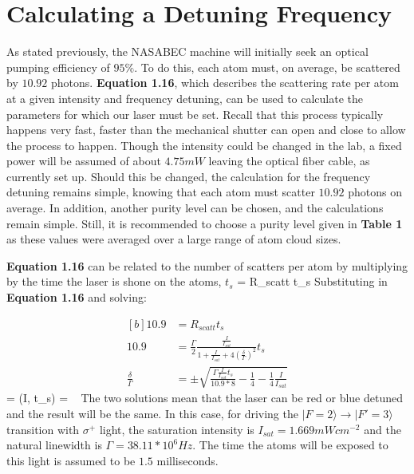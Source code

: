 \section{Calculating a Detuning Frequency}
As stated previously, the NASABEC machine will initially seek an optical pumping efficiency of $95\%$. To do this, each atom must, on average, be scattered by $10.92$ photons. \textbf{Equation 1.16}, which describes the scattering rate per atom at a given intensity and frequency detuning, can be used to calculate the parameters for which our laser must be set. Recall that this process typically happens very fast, faster than the mechanical shutter can open and close to allow the process to happen. Though the intensity could be changed in the lab, a fixed power will be assumed of about $4.75 mW$ leaving the optical fiber cable, as currently set up. Should this be changed, the calculation for the frequency detuning remains simple, knowing that each atom must scatter $10.92$ photons on average. In addition, another purity level can be chosen, and the calculations remain simple. Still, it is recommended to choose a purity level given in \textbf{Table 1} as these values were averaged over a large range of atom cloud sizes. 

\textbf{Equation 1.16} can be related to the number of scatters per atom by multiplying by the time the laser is shone on the atoms, $t_s$
 = R_{scatt} t_s
\eeq
Substituting in \textbf{Equation 1.16} and solving:

\begin{equation}
        \begin{aligned}[b]
            10.9 &= R_{scatt} t_s\\
            10.9 &=  \frac{\Gamma}{2} \frac{\frac{I}{I_{sat}}}{1 + \frac{I}{I_{sat}} + 4 \left( \frac{\delta}{\Gamma}\right)^2 }t_s\\
            \frac{\delta}{\Gamma} &= \pm \sqrt{\frac{\Gamma\frac{I}{I_{sat}}t_s}{10.9*8} - \frac{1}{4} - \frac{1}{4}\frac{I}{I_{sat}}}
        \end{aligned}
\label{eqn2.qo}
\end{equation}
\beq
\delta = \delta(I, t_s) = \pm {}\ \Gamma
\eeq
The two solutions mean that the laser can be red or blue detuned and the result will be the same. In this case, for driving the $|F=2\rangle \rightarrow |F'=3\rangle$ transition with $\sigma^+$ light, the saturation intensity is $I_{sat} = 1.669 mWcm^{-2}$ and the natural linewidth is $\Gamma = 38.11 * 10^6Hz$. The time the atoms will be exposed to this light is assumed to be $1.5$ milliseconds. 

